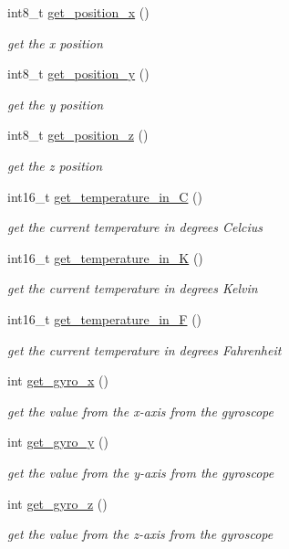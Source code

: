 \begin{DoxyCompactItemize}
int8\+\_\+t \hyperlink{classmpu6050_abd1ae3f3cdb9dc19c7ae899c733c9714}{get\+\_\+position\+\_\+x} ()
\begin{DoxyCompactList}\small\item\em get the x position \end{DoxyCompactList}\item 
int8\+\_\+t \hyperlink{classmpu6050_ac11bddbc6795e1c36b1f89b743ce63ec}{get\+\_\+position\+\_\+y} ()
\begin{DoxyCompactList}\small\item\em get the y position \end{DoxyCompactList}\item 
int8\+\_\+t \hyperlink{classmpu6050_aaac23fed6c6abfc50a5e41c5fdcd22e8}{get\+\_\+position\+\_\+z} ()
\begin{DoxyCompactList}\small\item\em get the z position \end{DoxyCompactList}\item 
int16\+\_\+t \hyperlink{classmpu6050_ab4e29f1ab6bd4ed7aa4f6ba0a4874c6a}{get\+\_\+temperature\+\_\+in\+\_\+C} ()
\begin{DoxyCompactList}\small\item\em get the current temperature in degrees Celcius \end{DoxyCompactList}\item 
int16\+\_\+t \hyperlink{classmpu6050_a8cce3546551572c7518962c193183a17}{get\+\_\+temperature\+\_\+in\+\_\+K} ()
\begin{DoxyCompactList}\small\item\em get the current temperature in degrees Kelvin \end{DoxyCompactList}\item 
int16\+\_\+t \hyperlink{classmpu6050_a3dd7248a256c2d7f7f465fdc5e4e5da8}{get\+\_\+temperature\+\_\+in\+\_\+F} ()
\begin{DoxyCompactList}\small\item\em get the current temperature in degrees Fahrenheit \end{DoxyCompactList}\item 
int \hyperlink{classmpu6050_aec7d7275fdb79b4c2e76dea2cdb99763}{get\+\_\+gyro\+\_\+x} ()
\begin{DoxyCompactList}\small\item\em get the value from the x-\/axis from the gyroscope \end{DoxyCompactList}\item 
int \hyperlink{classmpu6050_ad02ed5082341b88fe8f0231bcfe41b99}{get\+\_\+gyro\+\_\+y} ()
\begin{DoxyCompactList}\small\item\em get the value from the y-\/axis from the gyroscope \end{DoxyCompactList}\item 
int \hyperlink{classmpu6050_aa81a142fcb1ba3a3275bf9e2852434d6}{get\+\_\+gyro\+\_\+z} ()
\begin{DoxyCompactList}\small\item\em get the value from the z-\/axis from the gyroscope \end{DoxyCompactList}\end{DoxyCompactItemize}


